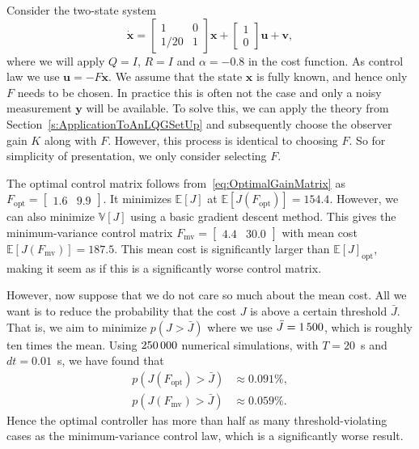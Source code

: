 \documentclass[twocolumn]{autart}
\newcommand{\ve}[1]{{\boldsymbol{#1}}} \newcommand{\tr}{\mbox{tr}} \newcommand{\ex}{\mathds{E}} \newcommand{\va}{\mathds{V}}
\begin{document}
Consider the two-state system
\begin{equation}\label{eq:SecondExampleSystem}
\ve{\dot{x}} = \begin{bmatrix}
1 & 0 \\
1/20 & 1
\end{bmatrix} \ve{x} + \begin{bmatrix}
1 \\
0
\end{bmatrix} \ve{u} + \ve{v},
\end{equation}
where we will apply $Q = I$, $R = I$ and $\alpha = -0.8$ in the cost function. As control law we use $\ve{u} = -F\ve{x}$. We assume that the state $\ve{x}$ is fully known, and hence only $F$ needs to be chosen. In practice this is often not the case and only a noisy measurement $\ve{y}$ will be available. To solve this, we can apply the theory from Section~\ref{s:ApplicationToAnLQGSetUp} and subsequently choose the observer gain $K$ along with $F$. However, this process is identical to choosing $F$. So for simplicity of presentation, we only consider selecting $F$.

The optimal control matrix follows from~\eqref{eq:OptimalGainMatrix} as $F_{\text{opt}} = \begin{bmatrix}
1.6 & 9.9
\end{bmatrix}$. It minimizes $\ex[J]$ at $\ex[J(F_{\text{opt}})] = 154.4$. However, we can also minimize $\va[J]$ using a basic gradient descent method. This gives the minimum-variance control matrix $F_{\text{mv}} = \begin{bmatrix}
4.4 & 30.0
\end{bmatrix}$ with mean cost $\ex[J(F_{\text{mv}})] = 187.5$. This mean cost is significantly larger than $\ex[J]_{\text{opt}}$, making it seem as if this is a significantly worse control matrix.

However, now suppose that we do not care so much about the mean cost. All we want is to reduce the probability that the cost $J$ is above a certain threshold $\bar{J}$. That is, we aim to minimize $p(J > \bar{J})$ where we use $\bar{J} = 1\thinspace 500$, which is roughly ten times the mean. Using $250 \thinspace 000$ numerical simulations, with \mbox{$T = 20$ s} and \mbox{$dt = 0.01$ s}, we have found that
\begin{align}
p(J(F_{\text{opt}}) > \bar{J}) &\approx 0.091\%, \\
p(J(F_{\text{mv}}) > \bar{J}) &\approx 0.059\%.
\end{align}
Hence the optimal controller has more than half as many threshold-violating cases as the minimum-variance control law, which is a significantly worse result. 
\end{document}
